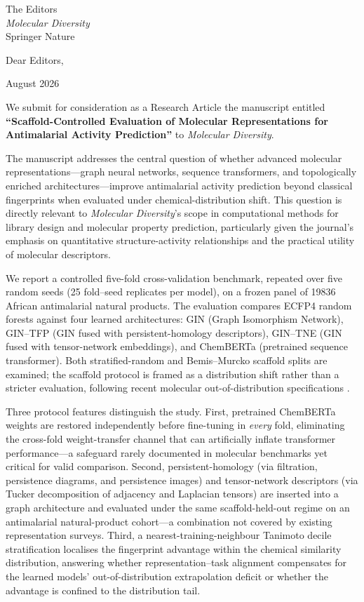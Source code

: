 \documentclass[11pt,a4paper]{letter}
\begin{document}
\begin{letter}{%
  The Editors \\
  \textit{Molecular Diversity} \\
  Springer Nature
}

\opening{Dear Editors,}

 August 2026

We submit for consideration as a Research Article the manuscript entitled \textbf{``Scaffold-Controlled Evaluation of Molecular Representations for Antimalarial Activity Prediction''} to \textit{Molecular Diversity}.

The manuscript addresses the central question of whether advanced molecular representations---graph neural networks, sequence transformers, and topologically enriched architectures---improve antimalarial activity prediction beyond classical fingerprints when evaluated under chemical-distribution shift. This question is directly relevant to \textit{Molecular Diversity}'s scope in computational methods for library design and molecular property prediction, particularly given the journal's emphasis on quantitative structure-activity relationships and the practical utility of molecular descriptors.

We report a controlled five-fold cross-validation benchmark, repeated over five random seeds (\num{25} fold--seed replicates per model), on a frozen panel of \num{19836} African antimalarial natural products. The evaluation compares ECFP4 random forests against four learned architectures: GIN (Graph Isomorphism Network), GIN--TFP (GIN fused with persistent-homology descriptors), GIN--TNE (GIN fused with tensor-network embeddings), and ChemBERTa (pretrained sequence transformer). Both stratified-random and Bemis--Murcko scaffold splits are examined; the scaffold protocol is framed as a distribution shift rather than a stricter evaluation, following recent molecular out-of-distribution specifications \citep{sheridan2024realworld,bash2025umap,fooladi2025ood}.

Three protocol features distinguish the study. First, pretrained ChemBERTa weights are restored independently before fine-tuning in \emph{every} fold, eliminating the cross-fold weight-transfer channel that can artificially inflate transformer performance---a safeguard rarely documented in molecular benchmarks yet critical for valid comparison. Second, persistent-homology (via filtration, persistence diagrams, and persistence images) and tensor-network descriptors (via Tucker decomposition of adjacency and Laplacian tensors) are inserted into a graph architecture and evaluated under the same scaffold-held-out regime on an antimalarial natural-product cohort---a combination not covered by existing representation surveys. Third, a nearest-training-neighbour Tanimoto decile stratification localises the fingerprint advantage within the chemical similarity distribution, answering whether representation--task alignment compensates for the learned models' out-of-distribution extrapolation deficit or whether the advantage is confined to the distribution tail.


\end{letter}
\end{document}
